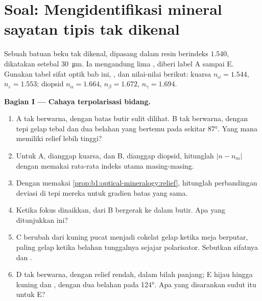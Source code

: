 \section{Soal: Mengidentifikasi mineral sayatan tipis tak dikenal}

\begin{problem}
\label{pb:b1:optical-mineralogy:1}
Sebuah  batuan beku tak dikenal, dipasang dalam resin berindeks $1.540$, dikatakan setebal \qty{30}{\micro m}. Ia mengandung lima , diberi label A sampai E. Gunakan tabel sifat optik bab ini, , dan nilai-nilai berikut: kuarsa $n_\omega = 1.544$, $n_\varepsilon = 1.553$; diopsid $n_\alpha = 1.664$, $n_\beta = 1.672$, $n_\gamma = 1.694$.

\medskip
\noindent\textbf{Bagian I --- Cahaya terpolarisasi bidang.}
\begin{enumerate}
  \item {} A tak berwarna, dengan batas butir sulit dilihat.  B tak berwarna, dengan tepi gelap tebal dan dua belahan yang bertemu pada sekitar \ang{87}. Yang mana memiliki relief lebih tinggi?
  \item Untuk A, dianggap kuarsa, dan B, dianggap diopsid, hitunglah $|n - n_m|$ dengan memakai rata-rata indeks utama masing-masing.
  \item Dengan memakai \cref{prop:b1:optical-mineralogy:relief}, hitunglah perbandingan deviasi di tepi mereka untuk gradien batas yang sama.
  \item Ketika fokus dinaikkan,  dari B bergerak ke dalam butir. Apa yang ditunjukkan ini?
  \item {} C berubah dari kuning pucat menjadi cokelat gelap ketika meja berputar, paling gelap ketika belahan tunggalnya sejajar polarisator. Sebutkan sifatnya dan .
  \item {} D tak berwarna, dengan relief rendah, dalam bilah panjang; E hijau hingga kuning dan , dengan dua belahan pada \ang{124}. Apa yang disarankan sudut itu untuk E?
\end{enumerate}


\end{problem}

